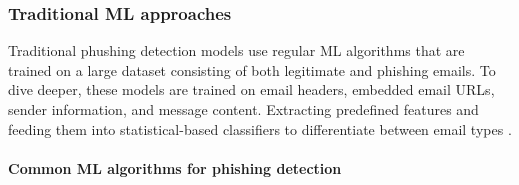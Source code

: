 \subsubsection*{Traditional ML approaches}
Traditional phushing detection models use regular ML algorithms that are trained on a large dataset consisting of both legitimate and phishing emails. To dive deeper, these models are trained on email headers, embedded email URLs, sender information, and message content. Extracting predefined features and feeding them into statistical-based classifiers to differentiate between email types \citep{chandrasekaran2006phoney}.

\paragraph{Common ML algorithms for phishing detection}
